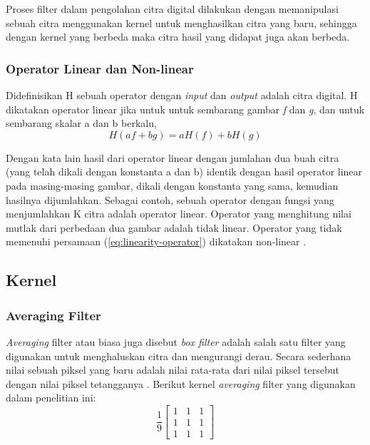 Proses filter dalam pengolahan citra digital dilakukan dengan memanipulasi sebuah citra menggunakan kernel untuk menghasilkan citra yang baru, sehingga dengan kernel yang berbeda maka citra hasil yang didapat juga akan berbeda. 


\subsubsection{Operator Linear dan Non-linear}
Didefinisikan H sebuah operator dengan \textit{input} dan \textit{output} adalah citra digital. H dikatakan operator linear jika untuk untuk sembarang gambar \textit{f} dan \textit{g}, dan untuk sembarang skalar a dan b berkalu,
\begin{equation}
    \label{eq:linearity-operator}
    H(af + bg) = aH(f) + bH(g)
\end{equation}

Dengan kata lain hasil dari operator linear dengan jumlahan dua buah citra (yang telah dikali dengan konstanta a dan b) identik dengan hasil operator linear pada masing-masing gambar, dikali dengan konstanta yang sama, kemudian hasilnya dijumlahkan. Sebagai contoh, sebuah operator dengan fungsi yang menjumlahkan K citra adalah operator linear. Operator yang menghitung nilai mutlak dari perbedaan dua gambar adalah tidak linear. Operator yang tidak memenuhi persamaan (\ref{eq:linearity-operator}) dikatakan non-linear .


\subsection{Kernel}

\subsubsection{Averaging Filter}
\textit{Averaging} filter atau biasa juga disebut \textit{box filter} adalah salah satu filter yang digunakan untuk menghaluskan citra dan mengurangi derau. Secara sederhana nilai sebuah piksel yang baru adalah nilai rata-rata dari nilai piksel tersebut dengan nilai piksel tetangganya . Berikut kernel \textit{averaging} filter yang digunakan dalam penelitian ini:
\begin{equation}
    \label{kernel:average}
    \frac{1}{9} \left[
    \begin{matrix}
        1 & 1 & 1 \\
        1 & 1 & 1 \\
        1 & 1 & 1
    \end{matrix}
    \right]
\end{equation}

